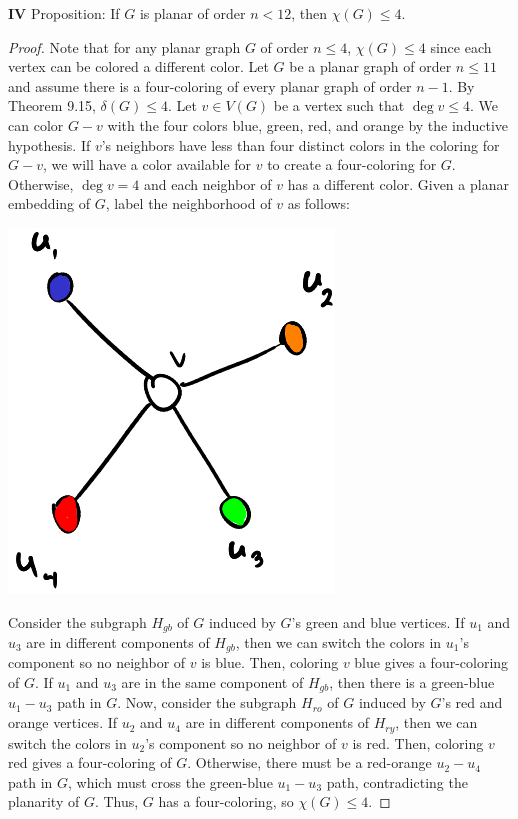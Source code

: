 \documentclass[12pt]{article}
\begin{document}
\medskip\noindent\textbf{IV} Proposition: If $G$ is planar of order $n < 12$, then $\chi(G) \leq 4$.
\begin{proof}
    Note that for any planar graph $G$ of order $n \leq 4$, $\chi(G) \leq 4$ since each vertex can be colored a different color.
    Let $G$ be a planar graph of order $n \leq 11$ and assume there is a four-coloring of every planar graph of order $n-1$.
    By Theorem 9.15, $\delta(G) \leq 4$.
    Let $v\in V(G)$ be a vertex such that $\deg v \leq 4$.
    We can color $G-v$ with the four colors blue, green, red, and orange by the inductive hypothesis.
    If $v$'s neighbors have less than four distinct colors in the coloring for $G-v$, we will have a color available for $v$ to create a four-coloring for $G$.
    Otherwise, $\deg v = 4$ and each neighbor of $v$ has a different color.
    Given a planar embedding of $G$, label the neighborhood of $v$ as follows:
    \begin{center} \includegraphics[scale=.4]{fig2.png} \end{center}
    
    Consider the subgraph $H_{gb}$ of $G$ induced by $G$'s green and blue vertices.
    If $u_1$ and $u_3$ are in different components of $H_{gb}$, then we can switch the colors in $u_1$'s component so no neighbor of $v$ is blue.
    Then, coloring $v$ blue gives a four-coloring of $G$.
    If $u_1$ and $u_3$ are in the same component of $H_{gb}$, then there is a green-blue $u_1-u_3$ path in $G$.
    Now, consider the subgraph $H_{ro}$ of $G$ induced by $G$'s red and orange vertices.
    If $u_2$ and $u_4$ are in different components of $H_{ry}$, then we can switch the colors in $u_2$'s component so no neighbor of $v$ is red.
    Then, coloring $v$ red gives a four-coloring of $G$.
    Otherwise, there must be a red-orange $u_2-u_4$ path in $G$, which must cross the green-blue $u_1-u_3$ path, contradicting the planarity of $G$.
    Thus, $G$ has a four-coloring, so $\chi(G) \leq 4$.
\end{proof}
\end{document}
